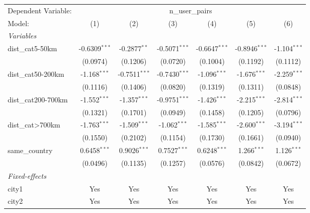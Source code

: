 
\begingroup
\centering
\begin{tabular}{lcccccc}
   \tabularnewline \midrule \midrule
   Dependent Variable: & \multicolumn{6}{c}{n\_user\_pairs}\\
   Model:              & (1)             & (2)             & (3)             & (4)             & (5)             & (6)\\  
   \midrule
   \emph{Variables}\\
   dist\_cat5-50km     & -0.6309$^{***}$ & -0.2877$^{**}$  & -0.5071$^{***}$ & -0.6647$^{***}$ & -0.8946$^{***}$ & -1.104$^{***}$\\   
                       & (0.0974)        & (0.1206)        & (0.0720)        & (0.1004)        & (0.1192)        & (0.1112)\\   
   dist\_cat50-200km   & -1.168$^{***}$  & -0.7511$^{***}$ & -0.7430$^{***}$ & -1.096$^{***}$  & -1.676$^{***}$  & -2.259$^{***}$\\   
                       & (0.1116)        & (0.1406)        & (0.0820)        & (0.1319)        & (0.1311)        & (0.0848)\\   
   dist\_cat200-700km  & -1.552$^{***}$  & -1.357$^{***}$  & -0.9751$^{***}$ & -1.426$^{***}$  & -2.215$^{***}$  & -2.814$^{***}$\\   
                       & (0.1321)        & (0.1701)        & (0.0949)        & (0.1458)        & (0.1205)        & (0.0796)\\   
   dist\_cat>700km     & -1.763$^{***}$  & -1.509$^{***}$  & -1.062$^{***}$  & -1.585$^{***}$  & -2.600$^{***}$  & -3.194$^{***}$\\   
                       & (0.1550)        & (0.2102)        & (0.1154)        & (0.1730)        & (0.1661)        & (0.0940)\\   
   same\_country       & 0.6458$^{***}$  & 0.9026$^{***}$  & 0.7527$^{***}$  & 0.6248$^{***}$  & 1.266$^{***}$   & 1.126$^{***}$\\   
                       & (0.0496)        & (0.1135)        & (0.1257)        & (0.0576)        & (0.0842)        & (0.0672)\\   
   \midrule
   \emph{Fixed-effects}\\
   city1               & Yes             & Yes             & Yes             & Yes             & Yes             & Yes\\  
   city2               & Yes             & Yes             & Yes             & Yes             & Yes             & Yes\\  
   \midrule

\end{tabular}
